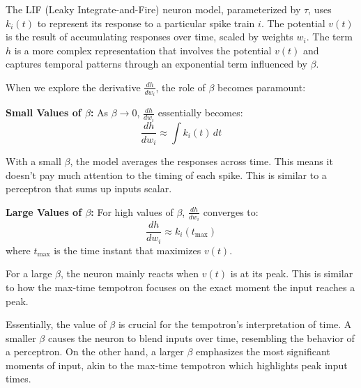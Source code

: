 \documentclass{article}
\begin{document}
The LIF (Leaky Integrate-and-Fire) neuron model, parameterized by \(\tau\), uses \(k_i(t)\) to represent its response to a particular spike train \(i\). The potential \(v(t)\) is the result of accumulating responses over time, scaled by weights \(w_i\). The term \(h\) is a more complex representation that involves the potential \(v(t)\) and captures temporal patterns through an exponential term influenced by \(\beta\).

When we explore the derivative \(\frac{dh}{dw_i}\), the role of \(\beta\) becomes paramount:

\textbf{Small Values of \(\beta\):}
As \(\beta \to 0\), \(\frac{dh}{dw_i}\) essentially becomes:
\[ \frac{dh}{dw_i} \approx \int k_i(t) \, dt \]

With a small \(\beta\), the model averages the responses across time. This means it doesn't pay much attention to the timing of each spike. This is similar to a perceptron that sums up inputs scalar.

\textbf{Large Values of \(\beta\):}
For high values of \(\beta\), \(\frac{dh}{dw_i}\) converges to:
\[ \frac{dh}{dw_i} \approx k_i(t_{\text{max}}) \]
where \(t_{\text{max}}\) is the time instant that maximizes \(v(t)\).

For a large \(\beta\), the neuron mainly reacts when \(v(t)\) is at its peak. This is similar to how the max-time tempotron focuses on the exact moment the input reaches a peak.

Essentially, the value of \(\beta\) is crucial for the tempotron's interpretation of time. A smaller \(\beta\) causes the neuron to blend inputs over time, resembling the behavior of a perceptron. On the other hand, a larger \(\beta\) emphasizes the most significant moments of input, akin to the max-time tempotron which highlights peak input times.
\end{document}
